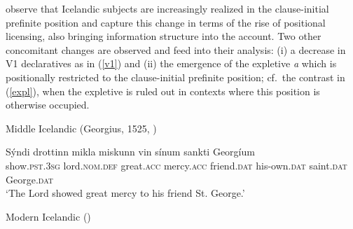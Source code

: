 \documentclass[output=paper,hidelinks]{langscibook}
\begin{document}
\citet{Booth17} observe that Icelandic subjects are increasingly realized in the clause-initial prefinite position and capture this change in terms of the rise of positional licensing, also bringing information structure into the account. Two other concomitant changes are observed and feed into their analysis: (i) a decrease in V1 declaratives as in (\ref{v1}) and (ii) the emergence of the expletive \textit{{\th}a{\dh}} which is positionally restricted to the clause-initial prefinite position; cf.~the contrast in (\ref{expl}), when the expletive is ruled out in contexts where this position is otherwise occupied.


\begin{exe}
\ex \label{v1} Middle Icelandic (Georgius, 1525, \citealp[111]{Booth17})

\gll S\'yndi drottinn mikla miskunn vin sínum sankti Georgíum\\
show.\textsc{pst.3sg} lord.\textsc{nom.def} great.\textsc{acc} mercy.\textsc{acc} friend.\textsc{dat} his-own.\textsc{dat} saint.\textsc{dat} George.\textsc{dat}\\
\glt `The Lord showed great mercy to his friend St. George.' 


\end{exe}

\begin{exe}
\ex \label{expl} Modern Icelandic (\citealp[111--112]{Booth17})
\begin{xlist}


\end{xlist}
\end{exe}
\end{document}
